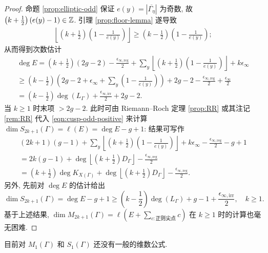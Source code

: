 \begin{proof}
	命题 \ref{prop:elliptic-odd} 保证 $e(y) = \left| \overline{\Gamma_\eta} \right|$ 为奇数, 故 $\left( k + \frac{1}{2} \right)(e(y)-1) \in \mathbb{Z}$. 引理 \ref{prop:floor-lemma} 遂导致
	\begin{gather*}
		\left\lfloor \left(k + \frac{1}{2}\right) \left( 1 - \frac{1}{e(y)} \right) \right\rfloor \geq \left( k - \frac{1}{2} \right) \left( 1 - \frac{1}{e(y)} \right);
	\end{gather*}
	从而得到次数估计
	\begin{multline*}
		\deg E = \left( k + \frac{1}{2} \right) (2g-2) - \frac{\epsilon_{\infty, \text{reg}}}{2} + \sum_y \left\lfloor \left( k + \frac{1}{2} \right) \left( 1 - \frac{1}{e(y)} \right) \right\rfloor + k\epsilon_\infty \\
		\geq \left( k - \frac{1}{2} \right) \left( 2g - 2 + \epsilon_\infty + \sum_y \left( 1 - \frac{1}{e(y)} \right) \right) + 2g - 2 - \frac{\epsilon_{\infty, \text{reg}}}{2} + \frac{\epsilon_\infty}{2} \\
		= \left( k - \frac{1}{2} \right) \deg(L_\Gamma) + \frac{\epsilon_{\infty, \text{irr}}}{2} + 2g-2.  
	\end{multline*}
	当 $k \geq 1$ 时末项 $> 2g-2$. 此时可由 Riemann--Roch 定理 \ref{prop:RR} 或其注记 \ref{rem:RR} 代入 \eqref{eqn:cusp-odd-positive} 来计算 $\dim S_{2k+1}(\Gamma) = \ell(E) = \deg E - g + 1$: 结果可写作
	\begin{multline*}
		(2k+1)(g-1) + \sum_y \left\lfloor \left( k + \frac{1}{2} \right) \left( 1 - \frac{1}{e(y)}\right) \right\rfloor + k\epsilon_\infty - \frac{\epsilon_{\infty, \text{reg}}}{2} - g + 1 \\
		= 2k(g-1) + \deg \left\lfloor \left( k + \frac{1}{2} \right) D_\Gamma \right\rfloor - \frac{\epsilon_{\infty, \text{reg}}}{2} \\
		= \left( k + \frac{1}{2} \right) \deg K_{X(\Gamma)} + \deg \left\lfloor \left( k + \frac{1}{2} \right) D_\Gamma \right\rfloor - \frac{\epsilon_{\infty, \text{reg}}}{2}.
	\end{multline*}
	另外, 先前对 $\deg E$ 的估计给出
	\[ \dim S_{2k+1}(\Gamma) = \deg E - g + 1 \geq \left( k - \frac{1}{2} \right) \deg(L_\Gamma) + g - 1 + \frac{\epsilon_{\infty, \text{irr}}}{2}, \quad k \geq 1. \]
	基于上述结果, $\dim M_{2k+1}(\Gamma) = \ell\left( E + \sum_{c: \text{正则尖点}} c \right)$ 在 $k \geq 1$ 时的计算也毫无困难.
\end{proof}

目前对 $M_1(\Gamma)$ 和 $S_1(\Gamma)$ 还没有一般的维数公式.

